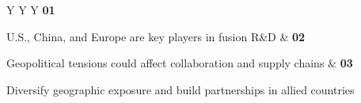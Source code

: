 \documentclass[10pt,a4paper]{article}
\begin{document}
\vspace{5pt}\noindent\begin{tabularx}{\linewidth}{Y Y Y}
{\textcolor{BOGreen}{\bfseries 01}}\par{\scriptsize\color{BOText} U.S., China, and Europe are key players in fusion R\&D} & {\textcolor{BOGreen}{\bfseries 02}}\par{\scriptsize\color{BOText} Geopolitical tensions could affect collaboration and supply chains} & {\textcolor{BOGreen}{\bfseries 03}}\par{\scriptsize\color{BOText} Diversify geographic exposure and build partnerships in allied countries} \\
\end{tabularx}\par\vspace{2pt}
\label{chap:7:end}
\end{document}
